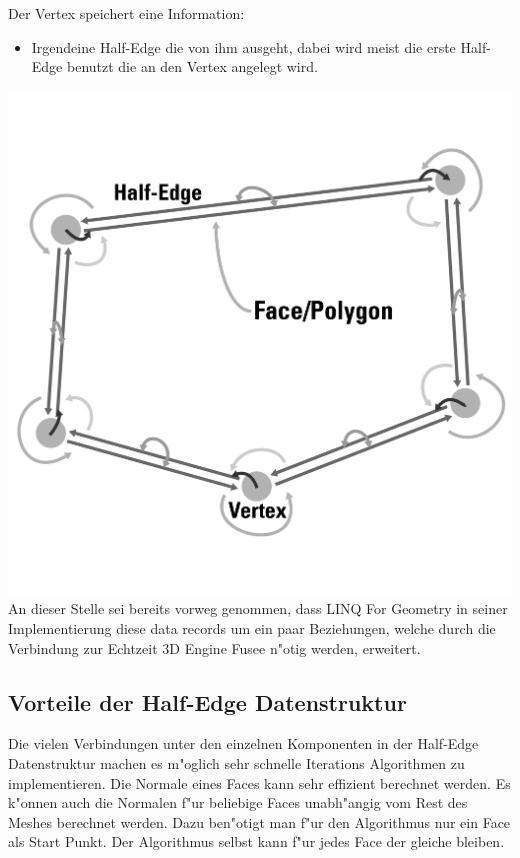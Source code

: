 \documentclass[pagesize, paper=a4, fontsize=12pt,titlepage=true, headings=small, headnosepline, abstractoff, liststotoc, nochapterprefix, plainheadsepline]{scrreprt}
\newcommand{\LFGS}{LINQ For Geometry }
\newcommand{\HES}{Half-Edge Datenstruktur }
\begin{document}
Der Vertex speichert eine Information:
\begin{itemize}
\item Irgendeine Half-Edge die von ihm ausgeht, dabei wird meist die erste Half-Edge benutzt die an den Vertex angelegt wird.
\end{itemize}

\includegraphics[width=\linewidth]{../Bilder/hesBeziehungen}
\label{pic:polyConnections} 
\vspace{15mm}
An dieser Stelle sei bereits vorweg genommen, dass \LFGS in seiner Implementierung diese data records um ein paar Beziehungen, welche durch die Verbindung zur Echtzeit 3D Engine Fusee n"otig werden, erweitert.

		\subsection {Vorteile der \HES}
			Die vielen Verbindungen unter den einzelnen Komponenten in der \HES machen es m"oglich sehr schnelle Iterations Algorithmen zu implementieren. Die Normale eines Faces kann sehr effizient berechnet werden. Es k"onnen auch die Normalen f"ur beliebige Faces unabh"angig vom Rest des Meshes berechnet werden. Dazu ben"otigt man f"ur den Algorithmus nur ein Face als Start Punkt. Der Algorithmus selbst kann f"ur jedes Face der gleiche bleiben.
\end{document}
